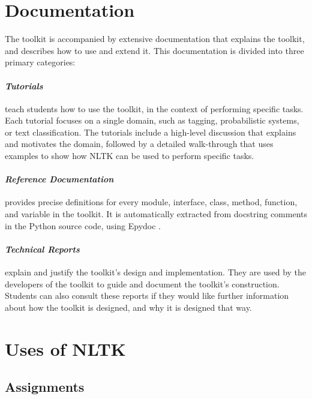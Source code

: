 \documentclass[11pt]{article}
\begin{document}
\section{Documentation}
\label{sec:documentation}

The toolkit is accompanied by extensive documentation that explains
the toolkit, and describes how to use and extend it.  This
documentation is divided into three primary categories:

\paragraph{\textit{Tutorials}} teach students how to use the toolkit,
in the context of performing specific tasks.  Each tutorial focuses on
a single domain, such as tagging, probabilistic systems, or text
classification.  The tutorials include a high-level discussion that
explains and motivates the domain, followed by a detailed
walk-through that uses examples to show how NLTK can be used to
perform specific tasks.

\paragraph{\textit{Reference Documentation}} provides precise
definitions for every module, interface, class, method, function, and
variable in the toolkit.  It is automatically extracted from docstring
comments in the Python source code, using Epydoc \cite{epydoc}.

\paragraph{\textit{Technical Reports}} explain and justify the
toolkit's design and implementation.  They are used by the developers
of the toolkit to guide and document the toolkit's construction.
Students can also consult these reports if they would like further
information about how the toolkit is designed, and why it is designed
that way.

\section{Uses of NLTK}
\label{sec:uses}

\subsection{Assignments}
\end{document}
